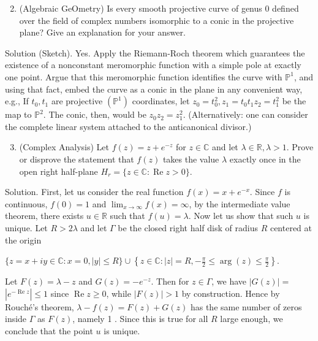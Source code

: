 \documentclass[10pt]{article}
\begin{document}
\begin{enumerate}
  \setcounter{enumi}{1}
  \item (Algebraic GeOmetry) Is every smooth projective curve of genus 0 defined over the field of complex numbers isomorphic to a conic in the projective plane? Give an explanation for your answer.
\end{enumerate}

Solution (Sketch). Yes. Apply the Riemann-Roch theorem which guarantees the existence of a nonconstant meromorphic function with a simple pole at exactly one point. Argue that this meromorphic function identifies the curve with $\mathbb{P}^{1}$, and using that fact, embed the curve as a conic in the plane in any convenient way, e.g., If $t_{0}, t_{1}$ are projective $\left(\mathbb{P}^{1}\right)$ coordinates, let $z_{0}=t_{0}^{2}, z_{1}=t_{0} t_{1} z_{2}=t_{1}^{2}$ be the map to $\mathbb{P}^{2}$. The conic, then, would be $z_{0} z_{2}=z_{1}^{2}$. (Alternatively: one can consider the complete linear system attached to the anticanonical divisor.)

\begin{enumerate}
  \setcounter{enumi}{2}
  \item (Complex Analysis) Let $f(z)=z+e^{-z}$ for $z \in \mathbb{C}$ and let $\lambda \in \mathbb{R}, \lambda>1$. Prove or disprove the statement that $f(z)$ takes the value $\lambda$ exactly once in the open right half-plane $H_{r}=\{z \in \mathbb{C}: \operatorname{Re} z>0\}$.
\end{enumerate}

Solution. First, let us consider the real function $f(x)=x+e^{-x}$. Since $f$ is continuous, $f(0)=1$ and $\lim _{x \rightarrow \infty} f(x)=\infty$, by the intermediate value theorem, there exists $u \in \mathbb{R}$ such that $f(u)=\lambda$. Now let us show that such $u$ is unique. Let $R>2 \lambda$ and let $\Gamma$ be the closed right half disk of radius $R$ centered at the origin

$\{z=x+i y \in \mathbb{C}: x=0,|y| \leq R\} \cup\left\{z \in \mathbb{C}:|z|=R,-\frac{\pi}{2} \leq \arg (z) \leq \frac{\pi}{2}\right\}$.

Let $F(z)=\lambda-z$ and $G(z)=-e^{-z}$. Then for $z \in \Gamma$, we have $|G(z)|=$ $\left|e^{-\operatorname{Re} z}\right| \leq 1$ since $\operatorname{Re} z \geq 0$, while $|F(z)|>1$ by construction. Hence by Rouché's theorem, $\lambda-f(z)=F(z)+G(z)$ has the same number of zeros inside $\Gamma$ as $F(z)$, namely 1 . Since this is true for all $R$ large enough, we conclude that the point $u$ is unique.
\end{document}
